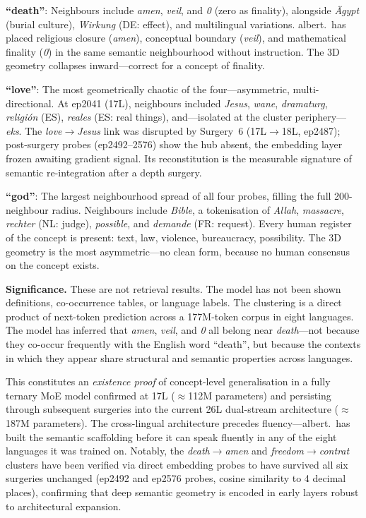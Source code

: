 \documentclass[11pt,a4paper]{article}
\begin{document}
\textbf{``death''}: Neighbours include \emph{amen}, \emph{veil}, and \emph{0} (zero as
finality), alongside \emph{Ägypt} (burial culture), \emph{Wirkung} (DE: effect), and
multilingual variations. albert.\ has placed religious closure (\emph{amen}), conceptual
boundary (\emph{veil}), and mathematical finality (\emph{0}) in the same semantic
neighbourhood without instruction. The 3D geometry collapses inward---correct for a
concept of finality.

\textbf{``love''}: The most geometrically chaotic of the four---asymmetric, multi-directional.
At ep2041 (17L), neighbours included \emph{Jesus}, \emph{wane}, \emph{dramaturg},
\emph{religión} (ES), \emph{reales} (ES: real things), and---isolated at the cluster
periphery---\emph{eks}. The \emph{love}$\to$\emph{Jesus} link was disrupted by Surgery~6
(17L$\to$18L, ep2487); post-surgery probes (ep2492--2576) show the hub absent, the embedding
layer frozen awaiting gradient signal. Its reconstitution is the measurable signature of
semantic re-integration after a depth surgery.

\textbf{``god''}: The largest neighbourhood spread of all four probes, filling the full 200-neighbour
radius. Neighbours include \emph{Bible}, a tokenisation of \emph{Allah}, \emph{massacre},
\emph{rechter} (NL: judge), \emph{possible}, and \emph{demande} (FR: request). Every human
register of the concept is present: text, law, violence, bureaucracy, possibility. The 3D
geometry is the most asymmetric---no clean form, because no human consensus on the concept exists.

\textbf{Significance.}
These are not retrieval results. The model has not been shown definitions, co-occurrence tables,
or language labels. The clustering is a direct product of next-token prediction across a
177M-token corpus in eight languages. The model has inferred that \emph{amen}, \emph{veil},
and \emph{0} all belong near \emph{death}---not because they co-occur frequently with the
English word ``death'', but because the contexts in which they appear share structural
and semantic properties across languages.

This constitutes an \emph{existence proof} of concept-level generalisation in a fully
ternary MoE model confirmed at 17L ($\approx$112M parameters) and persisting through
subsequent surgeries into the current 26L dual-stream architecture ($\approx$187M parameters).
The cross-lingual architecture precedes fluency---albert.\ has built
the semantic scaffolding before it can speak fluently in any of the eight languages it was
trained on. Notably, the \emph{death}$\to$\emph{amen} and \emph{freedom}$\to$\emph{contrat}
clusters have been verified via direct embedding probes to have survived all six surgeries
unchanged (ep2492 and ep2576 probes, cosine similarity to 4 decimal places), confirming
that deep semantic geometry is encoded in early layers robust to architectural expansion.
\end{document}
